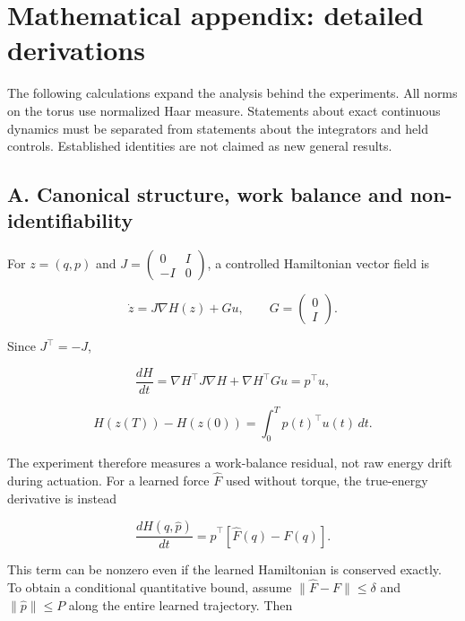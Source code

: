 \documentclass[
  10pt,
]{article}
\begin{document}
\clearpage

\hypertarget{mathematical-appendix-detailed-derivations}{%
\section*{Mathematical appendix: detailed
derivations}\label{mathematical-appendix-detailed-derivations}}

The following calculations expand the analysis behind the experiments.
All norms on the torus use normalized Haar measure. Statements about
exact continuous dynamics must be separated from statements about the
integrators and held controls. Established identities are not claimed as
new general results.

\hypertarget{a.-canonical-structure-work-balance-and-non-identifiability}{%
\subsection*{A. Canonical structure, work balance and
non-identifiability}\label{a.-canonical-structure-work-balance-and-non-identifiability}}

For \(z=(q,p)\) and \(J=\begin{pmatrix}0&I\\-I&0\end{pmatrix}\), a
controlled Hamiltonian vector field is

\[\dot z=J\nabla H(z)+G u,\qquad G=\begin{pmatrix}0\\I\end{pmatrix}.\]

Since \(J^\top=-J\),

\[\frac{dH}{dt}=\nabla H^\top J\nabla H+\nabla H^\top Gu=p^\top u,\]

\[H(z(T))-H(z(0))=\int_0^T p(t)^\top u(t)\,dt.\]

The experiment therefore measures a work-balance residual, not raw
energy drift during actuation. For a learned force \(\widehat F\) used
without torque, the true-energy derivative is instead

\[\frac{dH(q,\widehat p)}{dt}=\widehat p^\top[\widehat F(q)-F(q)].\]

This term can be nonzero even if the learned Hamiltonian is conserved
exactly. To obtain a conditional quantitative bound, assume
\(\|\widehat F-F\|\le\delta\) and \(\|\widehat p\|\le P\) along the
entire learned trajectory. Then
\end{document}
